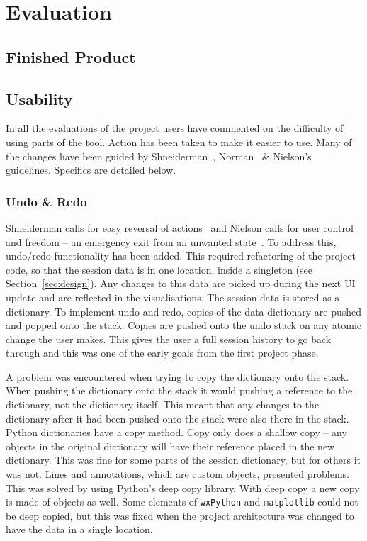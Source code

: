 \chapter{Evaluation}
\label{chap:eval}


\section{Finished Product}

\section{Usability}

In all the evaluations of the project users have commented on the difficulty of using parts of the tool.  Action has been taken to make it easier to use.  Many of the changes have been guided by Shneiderman~\cite{shgold}, Norman~\cite{normsev} \& Nielson's~\cite{neilten} guidelines.  Specifics are detailed below.

\subsection{Undo \& Redo}
\label{sec:undo}
Shneiderman calls for easy reversal of actions~\cite{shgold} and Nielson calls for user control and freedom -- an emergency exit from an unwanted state~\cite{neilten}.  To address this, undo/redo functionality has been added.  This required refactoring of the project code, so that the session data is in one location, inside a singleton (see Section~\ref{sec:design}). Any changes to this data are picked up during the next \ac{UI} update and are reflected in the visualisations.  The session data is stored as a dictionary.  To implement undo and redo, copies of the data dictionary are pushed and popped onto the stack.  Copies are pushed onto the undo stack on any atomic change the user makes.  This gives the user a full session history to go back through and this was one of the early goals from the first project phase.

A problem was encountered when trying to copy the dictionary onto the stack.  When pushing the dictionary onto the stack it would pushing a reference to the dictionary, not the dictionary itself. This meant that any changes to the dictionary after it had been pushed onto the stack were also there in the stack.  Python dictionaries have a copy method.  Copy only does a shallow copy -- any objects in the original dictionary will have their reference placed in the new dictionary.  This was fine for some parts of the session dictionary, but for others it was not. Lines and annotations, which are custom objects, presented problems.  This was solved by using Python's deep copy library.  With deep copy a new copy is made of objects as well.  Some elements of \texttt{wxPython} and \texttt{matplotlib} could not be deep copied, but this was fixed when the project architecture was changed to have the data in a single location.

